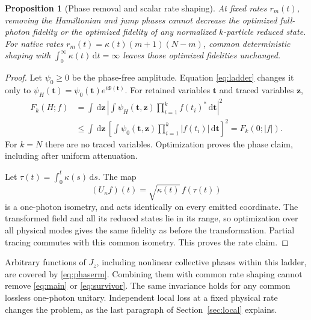 \documentclass[11pt,a4paper]{article}
\newtheorem{proposition}[theorem]{Proposition}
\newcommand{\dd}{\,\mathrm d}
\begin{document}
\begin{proposition}[Phase removal and scalar rate shaping]
At fixed rates \(r_m(t)\), removing the Hamiltonian and jump phases
cannot decrease the optimized full-photon fidelity or the optimized
fidelity of any normalized \(k\)-particle reduced state.
For native rates \(r_m(t)=\kappa(t)(m+1)(N-m)\), common deterministic
shaping with \(\int_0^\infty\kappa(t)\dd t=\infty\) leaves those
optimized fidelities unchanged.
\end{proposition}
\begin{proof}
Let \(\psi_0\ge0\) be the phase-free amplitude. Equation
\eqref{eq:ladder} changes it only to
\(\psi_H(\boldsymbol t)=\psi_0(\boldsymbol t)e^{i\Phi(\boldsymbol t)}\).
For retained variables \(\boldsymbol t\) and traced variables
\(\boldsymbol z\),
\begin{align}
 F_k(H;f)
 &=\int\dd\boldsymbol z\,
 \left|\int\psi_H(\boldsymbol t,\boldsymbol z)
                \prod_{i=1}^k f(t_i)^*\dd\boldsymbol t\right|^2\\
 &\le\int\dd\boldsymbol z\,
 \left[\int\psi_0(\boldsymbol t,\boldsymbol z)
                \prod_{i=1}^k |f(t_i)|\dd\boldsymbol t\right]^2
 =F_k(0;|f|).
 \label{eq:phaserm}
\end{align}
For \(k=N\) there are no traced variables. Optimization proves
the phase claim, including after uniform attenuation.

Let \(\tau(t)=\int_0^t\kappa(s)\dd s\). The map
\begin{equation}
 (U_\kappa f)(t)=\sqrt{\kappa(t)}\,f(\tau(t))
 \label{eq:isometry}
\end{equation}
is a one-photon isometry, and acts identically on every emitted
coordinate. The transformed field and all its reduced states lie
in its range, so optimization over all physical modes gives the
same fidelity as before the transformation. Partial tracing
commutes with this common isometry. This proves the rate claim.
\end{proof}

Arbitrary functions of \(J_z\), including nonlinear collective
phases within this ladder, are covered by \eqref{eq:phaserm}.
Combining them with common rate shaping cannot remove
\eqref{eq:main} or \eqref{eq:survivor}. The same invariance
holds for any common lossless one-photon unitary. Independent
local loss at a fixed physical rate changes the problem, as the
last paragraph of Section~\ref{sec:local} explains.
\end{document}
